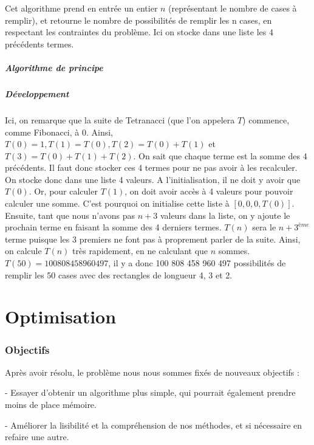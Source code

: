 \documentclass{article}
\begin{document}
Cet algorithme prend en entrée un entier $n$ (représentant le nombre de cases à remplir), et retourne le nombre de possibilités de remplir les n cases, en respectant les contraintes du problème. Ici on stocke dans une liste les 4 précédents termes.

\subsubsection{Algorithme de principe}



\subsubsection{Développement}
Ici, on remarque que la suite de Tetranacci (que l'on appelera $T$) commence, comme Fibonacci, à 0. Ainsi, $T(0) = 1, T(1) = T(0), T(2) = T(0) + T(1)$ et $T(3) = T(0) + T(1) + T(2)$. On sait que chaque terme est la somme des 4 précédents. Il faut donc stocker ces 4 termes pour ne pas avoir à les recalculer. On stocke donc dans une liste 4 valeurs. A l'initialisation, il ne doit y avoir que $T(0)$. Or, pour calculer $T(1)$, on doit avoir accès à 4 valeurs pour pouvoir calculer une somme. C'est pourquoi on initialise cette liste à $[0,0,0,T(0)]$. Ensuite, tant que nous n'avons pas $n+3$ valeurs dans la liste, on y ajoute le prochain terme en faisant la somme des 4 derniers termes. $T(n)$ sera le $n+3^{ème}$ terme puisque les 3 premiers ne font pas à proprement parler de la suite. Ainsi, on calcule $T(n)$ très rapidement, en ne calculant que $n$ sommes. $T(50) = 100808458960497$, il y a donc 100 808 458 960 497 possibilités de remplir les 50 cases avec des rectangles de longueur 4, 3 et 2.

\newpage
\part {Optimisation}
\section {Objectifs}

Après avoir résolu, le problème nous nous sommes fixés de nouveaux objectifs :

\noindent - Essayer d'obtenir un algorithme plus simple, qui pourrait également prendre moins de place mémoire.

\noindent - Améliorer la lisibilité et la compréhension de nos méthodes, et si nécessaire en refaire une autre.
\end{document}
